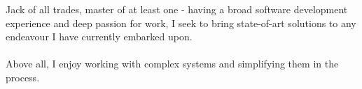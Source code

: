 \documentclass[9pt]{style/developercv}
\begin{document}
\begin{minipage}[t]{0.4\textwidth} %
	\vspace{-\baselineskip} %
	
	Jack of all trades, master of at least one - having a broad software development experience 
	and deep passion for work, I seek to bring state-of-art solutions to any endeavour
	I have currently embarked upon. \\ \\
	Above all, I enjoy working with complex systems and simplifying them in the process.

\end{minipage}
\hfill %
\begin{minipage}[t]{0.5\textwidth} %
	\vspace{-\baselineskip} %
	\begin{barchart}{5.5}
	\end{barchart}
\end{minipage}

\vspace{1cm}

\end{document}
